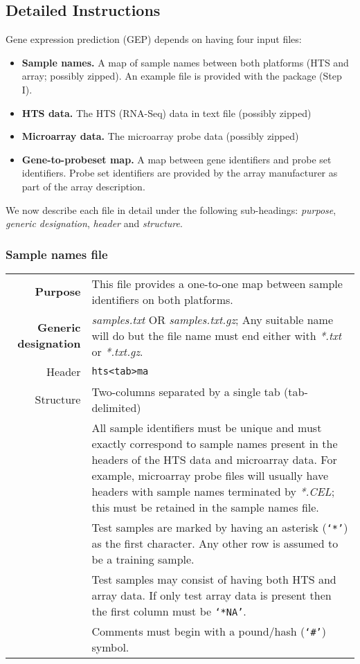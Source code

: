 \documentclass[a4paper,12pt]{article}
\begin{document}
\subsection{Detailed Instructions}
\label{gep:detailed}
Gene expression prediction (GEP) depends on having four input files:
\begin{itemize}
\item \textbf{Sample names.} A map of sample names between both platforms (HTS and array; possibly zipped). An example file is provided with the package (Step I).
\item \textbf{HTS data.} The HTS (RNA-Seq) data in text file (possibly zipped)
\item \textbf{Microarray data.} The microarray probe data (possibly zipped) 
\item \textbf{Gene-to-probeset map.} A map between gene identifiers and probe set identifiers. Probe set identifiers are provided by the array manufacturer as part of the array description.
\end{itemize}

We now describe each file in detail under the following sub-headings: \textit{purpose}, \textit{generic designation}, \textit{header} and \textit{structure}.

\subsubsection{Sample names file}
\label{gep:sample}

\begin{tabular}{rp{12cm}}
\textbf{Purpose} & This file provides a one-to-one map between sample identifiers on both platforms. \\
\textbf{Generic designation} & \textit{samples.txt} OR \textit{samples.txt.gz}; Any suitable name will do but the file name must end either with \textit{*.txt} or \textit{*.txt.gz}. \\
Header & \texttt{hts\textless tab\textgreater ma} \\
Structure & Two-columns separated by a single tab (tab-delimited) \\
  & All sample identifiers must be unique and must exactly correspond to sample names present in the headers of the HTS data and microarray data. For example, microarray probe files will usually have headers with sample names terminated by \textit{*.CEL}; this must be retained in the sample names file. \\
  & Test samples are marked by having an asterisk (\texttt{`*'}) as the first character. Any other row is assumed to be a training sample. \\
  & Test samples may consist of having both HTS and array data. If only test array data is present then the first column must be \texttt{`*NA'}. \\
  & Comments must begin with a pound/hash (\texttt{`\#'}) symbol. \\
\end{tabular}
\end{document}
